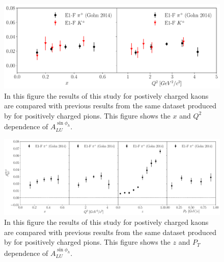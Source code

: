 
\begin{figure}
	\centering
	\includegraphics[width=16cm]{image/plots/kaon-bsa/compare-pion-xq2.pdf}
	\caption{In this figure the results of this study for postively charged kaons are compared with previous results from the same dataset produced by \cite{tmds-gohn:2014} for positively charged pions.  This figure shows the $x$ and $Q^2$ dependence of $A_{LU}^{\sin\phi_h}$.}
\end{figure}

\begin{figure}
	\centering
	\includegraphics[width=16cm]{image/plots/kaon-bsa/compare-pion-zpt.pdf}
	\caption{In this figure the results of this study for postively charged kaons are compared with previous results from the same dataset produced by \cite{tmds-gohn:2014} for positively charged pions.  This figure shows the $z$ and $P_T$ dependence of $A_{LU}^{\sin\phi_h}$.}
\end{figure}

